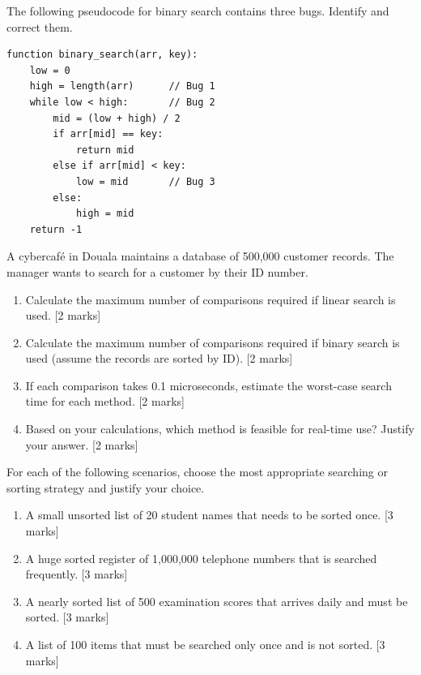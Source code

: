 \documentclass[11pt]{article}
\newcounter{popsec}
\newcounter{popsub}
\newcommand{\courssub}[1]{%
  \stepcounter{popsub}%
  \par\vspace{9pt}\noindent{\popxbold\fontsize{11.5}{13}\selectfont\color{popink}{\color{poporange}\thepopsec.\thepopsub}\hspace{6pt}#1}\par\nopagebreak\vspace{4pt}
}
\begin{document}
\begin{exercice}
The following pseudocode for binary search contains three bugs. Identify and correct them.
\begin{verbatim}
function binary_search(arr, key):
    low = 0
    high = length(arr)      // Bug 1
    while low < high:       // Bug 2
        mid = (low + high) / 2
        if arr[mid] == key:
            return mid
        else if arr[mid] < key:
            low = mid       // Bug 3
        else:
            high = mid
    return -1
\end{verbatim}
\end{exercice}

\courssub{I prepare for the GCE}
\begin{exercice}
A cybercafé in Douala maintains a database of 500,000 customer records. The manager wants to search for a customer by their ID number.
\begin{enumerate}
\item Calculate the maximum number of comparisons required if linear search is used. [2 marks]
\item Calculate the maximum number of comparisons required if binary search is used (assume the records are sorted by ID). [2 marks]
\item If each comparison takes 0.1 microseconds, estimate the worst-case search time for each method. [2 marks]
\item Based on your calculations, which method is feasible for real-time use? Justify your answer. [2 marks]
\end{enumerate}
\end{exercice}

\begin{exercice}
For each of the following scenarios, choose the most appropriate searching or sorting strategy and justify your choice.
\begin{enumerate}
\item A small unsorted list of 20 student names that needs to be sorted once. [3 marks]
\item A huge sorted register of 1,000,000 telephone numbers that is searched frequently. [3 marks]
\item A nearly sorted list of 500 examination scores that arrives daily and must be sorted. [3 marks]
\item A list of 100 items that must be searched only once and is not sorted. [3 marks]
\end{enumerate}
\end{exercice}
\end{document}
